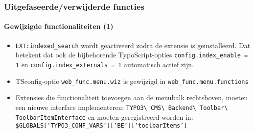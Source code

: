 \begin{frame}[fragile]
	\frametitle{Uitgefaseerde/verwijderde functies}
	\framesubtitle{Gewijzigde functionaliteiten (1)}

	\begin{itemize}

		\item \texttt{EXT:indexed\_search} wordt geactiveerd zodra de extensie is geïnstalleerd.
			Dat betekent dat ook de bijbehorende TypoScript-opties \small\texttt{config.index\_enable = 1} \normalsize
			en \small\texttt{config.index\_externals = 1} \normalsize automatisch actief zijn.
		
		\item TSconfig-optie \small\texttt{web\_func.menu.wiz}\normalsize\space
			is gewijzigd in \small\texttt{web\_func.menu.functions}\normalsize

		\item Extensies die functionaliteit toevoegen aan de menubalk rechtsboven, moeten een nieuwe interface implementeren:
			\small
				\texttt{TYPO3\textbackslash
					CMS\textbackslash
					Backend\textbackslash
					Toolbar\textbackslash
					ToolbarItemInterface}
			\normalsize\newline
			en moeten geregistreerd worden in:
			\small
				\texttt{\$GLOBALS['TYPO3\_CONF\_VARS']['BE']['toolbarItems']}
			\normalsize

	\end{itemize}

\end{frame}



